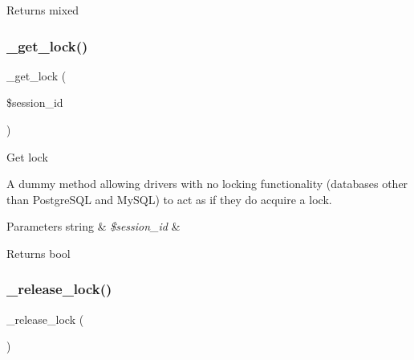 \begin{DoxyReturn}{Returns}
mixed 
\end{DoxyReturn}
\mbox{\label{class_c_i___session__driver_a2c49c8e23be3e2aca96a9d20de18ffc2}} 
\subsubsection{\texorpdfstring{\+\_\+get\+\_\+lock()}{\_get\_lock()}}
{\footnotesize\ttfamily \+\_\+get\+\_\+lock (\begin{DoxyParamCaption}\item[{}]{\$session\+\_\+id }\end{DoxyParamCaption})\hspace{0.3cm}{\ttfamily [protected]}}

Get lock

A dummy method allowing drivers with no locking functionality (databases other than Postgre\+S\+QL and My\+S\+QL) to act as if they do acquire a lock.


\begin{DoxyParams}[1]{Parameters}
string & {\em \$session\+\_\+id} & \\
\hline
\end{DoxyParams}
\begin{DoxyReturn}{Returns}
bool 
\end{DoxyReturn}
\mbox{\label{class_c_i___session__driver_a0265e356e6cf1eaba229663c1664c37d}} 
\subsubsection{\texorpdfstring{\+\_\+release\+\_\+lock()}{\_release\_lock()}}
{\footnotesize\ttfamily \+\_\+release\+\_\+lock (\begin{DoxyParamCaption}{ }\end{DoxyParamCaption})\hspace{0.3cm}{\ttfamily [protected]}}

